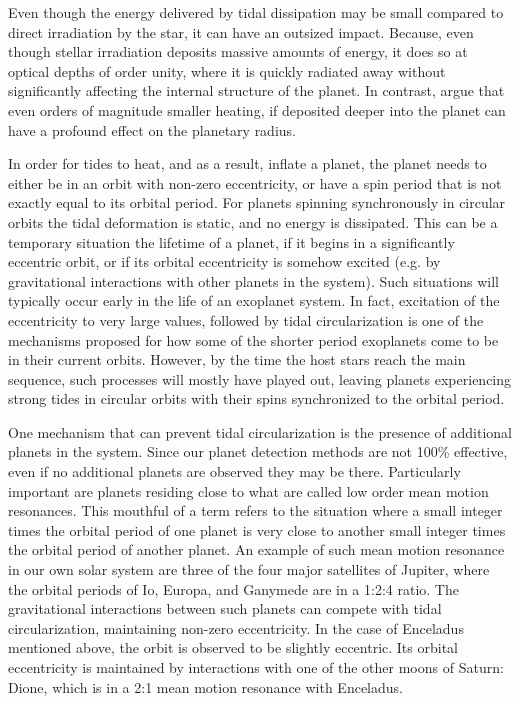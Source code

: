 Even though the energy delivered by tidal dissipation may be small compared to
direct irradiation by the star, it can have an outsized impact. Because, even
though stellar irradiation deposits massive amounts of energy, it does so at
optical depths of order unity, where it is quickly radiated away without
significantly affecting the internal structure of the planet. In contrast,
\citet{Komacek_Youdin_17} argue that even orders of magnitude smaller heating,
if deposited deeper into the planet can have a profound effect on the planetary
radius.

In order for tides to heat, and as a result, inflate a planet, the planet needs
to either be in an orbit with non-zero eccentricity, or have a spin period that
is not exactly equal to its orbital period. For planets spinning synchronously
in circular orbits the tidal deformation is static, and no energy is dissipated.
This can be a temporary situation the lifetime of a planet, if it begins in a
significantly eccentric orbit, or if its orbital eccentricity is somehow excited
(e.g. by gravitational interactions with other planets in the system). Such
situations will typically occur early in the life of an exoplanet system. In
fact, excitation of the eccentricity to very large values, followed by tidal
circularization is one of the mechanisms proposed for how some of the shorter
period exoplanets come to be in their current orbits. However, by the time the
host stars reach the main sequence, such processes will mostly have played out,
leaving planets experiencing strong tides in circular orbits with their spins
synchronized to the orbital period.

One mechanism that can prevent tidal circularization is the presence of
additional planets in the system. Since our planet detection methods are not
100\% effective, even if no additional planets are observed they may be there.
Particularly important are planets residing close to what are called low order
mean motion resonances. This mouthful of a term refers to the situation where a
small integer times the orbital period of one planet is very close to another
small integer times the orbital period of another planet. An example of such
mean motion resonance in our own solar system are three of the four major
satellites of Jupiter, where the orbital periods of Io, Europa, and Ganymede are
in a 1:2:4 ratio. The gravitational interactions between such planets can
compete with tidal circularization, maintaining non-zero eccentricity. In the
case of Enceladus mentioned above, the orbit is observed to be slightly
eccentric. Its orbital eccentricity is maintained by interactions with one of
the other moons of Saturn: Dione, which is in a 2:1 mean motion resonance with
Enceladus.

